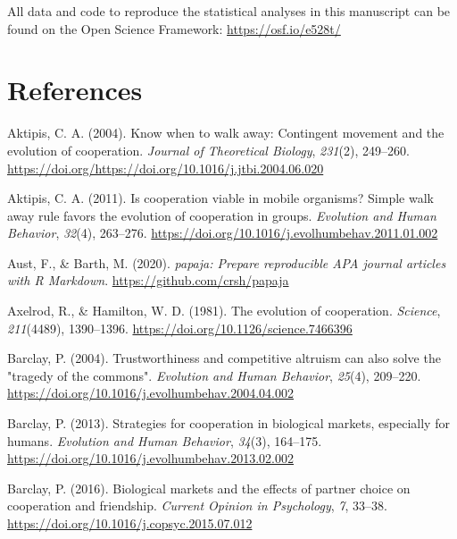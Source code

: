 \documentclass[english,man,floatsintext]{apa6}
\begin{document}
All data and code to reproduce the statistical analyses in this manuscript can be found on the Open Science Framework: \url{https://osf.io/e528t/}

\newpage

\hypertarget{references}{%
\section{References}\label{references}}

\begingroup
\setlength{\parindent}{-0.5in}
\setlength{\leftskip}{0.5in}

\hypertarget{refs}{}
\leavevmode\hypertarget{ref-Aktipis2004}{}%
Aktipis, C. A. (2004). Know when to walk away: Contingent movement and the evolution of cooperation. \emph{Journal of Theoretical Biology}, \emph{231}(2), 249--260. \url{https://doi.org/https://doi.org/10.1016/j.jtbi.2004.06.020}

\leavevmode\hypertarget{ref-Aktipis2011}{}%
Aktipis, C. A. (2011). Is cooperation viable in mobile organisms? Simple walk away rule favors the evolution of cooperation in groups. \emph{Evolution and Human Behavior}, \emph{32}(4), 263--276. \url{https://doi.org/10.1016/j.evolhumbehav.2011.01.002}

\leavevmode\hypertarget{ref-Aust2020}{}%
Aust, F., \& Barth, M. (2020). \emph{papaja: Prepare reproducible APA journal articles with R Markdown}. \url{https://github.com/crsh/papaja}

\leavevmode\hypertarget{ref-Axelrod1981}{}%
Axelrod, R., \& Hamilton, W. D. (1981). The evolution of cooperation. \emph{Science}, \emph{211}(4489), 1390--1396. \url{https://doi.org/10.1126/science.7466396}

\leavevmode\hypertarget{ref-Barclay2004}{}%
Barclay, P. (2004). Trustworthiness and competitive altruism can also solve the "tragedy of the commons". \emph{Evolution and Human Behavior}, \emph{25}(4), 209--220. \url{https://doi.org/10.1016/j.evolhumbehav.2004.04.002}

\leavevmode\hypertarget{ref-Barclay2013}{}%
Barclay, P. (2013). Strategies for cooperation in biological markets, especially for humans. \emph{Evolution and Human Behavior}, \emph{34}(3), 164--175. \url{https://doi.org/10.1016/j.evolhumbehav.2013.02.002}

\leavevmode\hypertarget{ref-Barclay2016b}{}%
Barclay, P. (2016). Biological markets and the effects of partner choice on cooperation and friendship. \emph{Current Opinion in Psychology}, \emph{7}, 33--38. \url{https://doi.org/10.1016/j.copsyc.2015.07.012}
\end{document}
